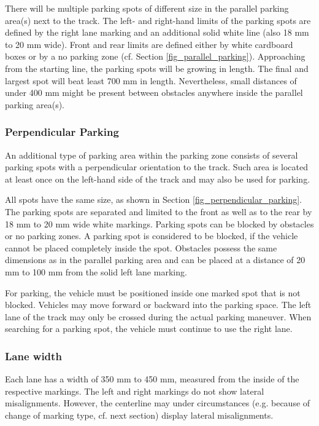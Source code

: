\documentclass[a4paper]{report}
\begin{document}
There will be multiple parking spots of different size in the parallel parking area(s) next to the track. The left- and right-hand limits of the parking spots are defined by the right lane marking and an additional solid white line (also 18 mm to 20 mm wide). Front and rear limits are defined either by white cardboard boxes or by a no parking zone (cf. Section \ref{fig_parallel_parking}). Approaching from the starting line, the parking spots will be growing in length. The final and largest spot will beat least 700 mm in length. Nevertheless, small distances of under 400 mm might be present between obstacles anywhere inside the parallel parking area(s). 

\subsubsection{Perpendicular Parking}

An additional type of parking area within the parking zone consists of several parking spots with a perpendicular orientation to the track. Such area is located at least once on the left-hand side of the track and may also be used for parking. 

All spots have the same size, as shown in Section \ref{fig_perpendicular_parking}. The parking spots are separated and limited to the front as well as to the rear by 18 mm to 20 mm wide white markings. Parking spots can be blocked by obstacles or no parking zones. A parking spot is considered to be blocked, if the vehicle cannot be placed completely inside the spot. Obstacles possess the same dimensions as in the parallel parking area and can be placed at a distance of 20 mm to 100 mm from the solid left lane marking. 

For parking, the vehicle must be positioned inside one marked spot that is not blocked. Vehicles may move forward or backward into the parking space. The left lane of the track may only be crossed during the actual parking maneuver. When searching for a parking spot, the vehicle must continue to use the right lane. 

\subsubsection{Lane width}

Each lane has a width of 350 mm to 450 mm, measured from the inside of the respective markings. The left and right markings do not show lateral misalignments. However, the centerline may under circumstances (e.g. because of change of marking type, cf. next section) display lateral misalignments. 
\end{document}
